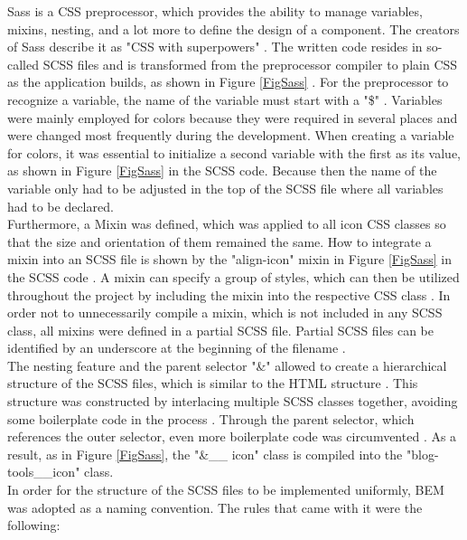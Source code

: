 \documentclass[Bachelor,BIF,english]{twbook}
\begin{document}
Sass is a CSS preprocessor, which provides the ability to manage variables, mixins, nesting, and a lot more to define the design of a component. The creators of Sass describe it as "CSS with superpowers" \cite{Sass}. The written code resides in so-called SCSS files and is transformed from the preprocessor compiler to plain CSS as the application builds, as shown in Figure \ref{FigSass} \cite[p.~168]{CSSPreproc}. For the preprocessor to recognize a variable, the name of the variable must start with a "\$" \cite[p.~169]{CSSPreproc} \cite{SassVariables}. Variables were mainly employed for colors because they were required in several places and were changed most frequently during the development. When creating a variable for colors, it was essential to initialize a second variable with the first as its value, as shown in Figure \ref{FigSass} in the SCSS code. Because then the name of the variable only had to be adjusted in the top of the SCSS file where all variables had to be declared. 
\\[\baselineskip]
Furthermore, a Mixin was defined, which was applied to all icon CSS classes so that the size and orientation of them remained the same. How to integrate a mixin into an SCSS file is shown by the "align-icon" mixin in Figure \ref{FigSass} in the SCSS code \cite{SassMixin}. A mixin can specify a group of styles, which can then be utilized throughout the project by including the mixin into the respective CSS class \cite[p.~170]{CSSPreproc} \cite{SassMixin}. In order not to unnecessarily compile a mixin, which is not included in any SCSS class, all mixins were defined in a partial SCSS file. Partial SCSS files can be identified by an underscore at the beginning of the filename \cite{SassPartial}.
\\[\baselineskip]
The nesting feature and the parent selector "\&" allowed to create a hierarchical structure of the SCSS files, which is similar to the HTML structure \cite[p.~169-170]{CSSPreproc} \cite{SassParent} \cite{SassNesting}. This structure was constructed by interlacing multiple SCSS classes together, avoiding some boilerplate code in the process \cite{SassNesting}. Through the parent selector, which references the outer selector, even more boilerplate code was circumvented \cite{SassParent}. As a result, as in Figure \ref{FigSass}, the "\&\_\_ icon" class is compiled into the "blog-tools\_\_icon" class.
\\[\baselineskip]
In order for the structure of the SCSS files to be implemented uniformly, BEM was adopted as a naming convention. The rules that came with it were the following: 
\end{document}
